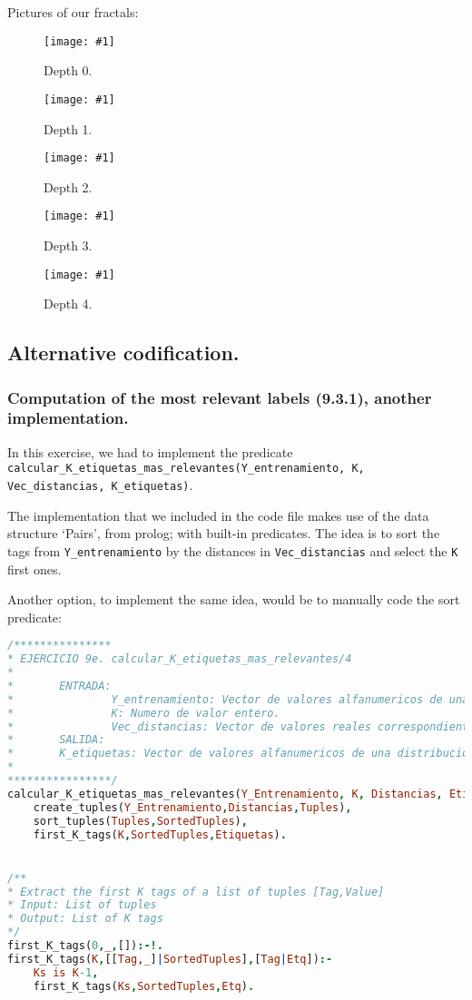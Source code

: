 \documentclass{article}
\newcommand{\myFigure}[4]{%
    \begin{figure}[H]
        \texttt{[image: \#1]}
        \centering
        \caption{#2}
        \label{#3}
    \end{figure}
}
\begin{document}
\vspace{.5cm}
Pictures of our fractals:

\myFigure{./img/d0}{Depth 0.}{d}{.6}
\myFigure{./img/d1}{Depth 1.}{d}{.6}
\myFigure{./img/d2}{Depth 2.}{d}{.6}
\myFigure{./img/d3}{Depth 3.}{d}{.6}
\myFigure{./img/d4}{Depth 4.}{d}{.6}


\newpage
\begin{appendices}
\section{Alternative codification.}
\subsubsection*{Computation of the most relevant labels (9.3.1), another implementation.}

In this exercise, we had to implement the predicate \texttt{calcular\_K\_etiquetas\_mas\_relevantes(Y\_entrenamiento, K, Vec\_distancias, K\_etiquetas)}.

The implementation that we included in the code file makes use of the data structure `Pairs', from prolog; with built-in predicates. The idea is to sort the tags from \texttt{Y\_entrenamiento} by the distances in \texttt{Vec\_distancias} and select the \texttt{K} first ones. 

Another option, to implement the same idea, would be to manually code the sort predicate:

\begin{lstlisting}[language=prolog, captionpos=t, caption={Alternate implementation of \texttt{calcular\_K\_etiquetas\_mas\_relevantes/4}.}]
/***************
* EJERCICIO 9e. calcular_K_etiquetas_mas_relevantes/4
*
*       ENTRADA:
*               Y_entrenamiento: Vector de valores alfanumericos de una distribucion categorica. Cada etiqueta corresponde a una instancia de X_entrenamiento.
*               K: Numero de valor entero.
*               Vec_distancias: Vector de valores reales correspondiente a una fila de Matriz_resultados.
*       SALIDA:
*		K_etiquetas: Vector de valores alfanumericos de una distribucion categorica.
*
****************/
calcular_K_etiquetas_mas_relevantes(Y_Entrenamiento, K, Distancias, Etiquetas):-
    create_tuples(Y_Entrenamiento,Distancias,Tuples),
    sort_tuples(Tuples,SortedTuples),
    first_K_tags(K,SortedTuples,Etiquetas).


/**
* Extract the first K tags of a list of tuples [Tag,Value]
* Input: List of tuples
* Output: List of K tags
*/
first_K_tags(0,_,[]):-!.
first_K_tags(K,[[Tag,_]|SortedTuples],[Tag|Etq]):-
    Ks is K-1,
    first_K_tags(Ks,SortedTuples,Etq).
    

\end{lstlisting}
\end{appendices}
\end{document}
